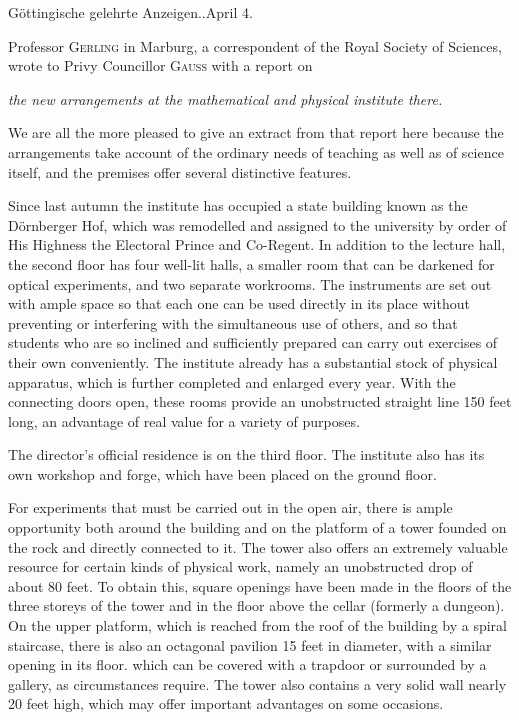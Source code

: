 \vspace{6mm}
\begin{center}\small Göttingische gelehrte Anzeigen..\quad April 4.\end{center}

Professor \textsc{Gerling} in Marburg, a correspondent of the Royal Society of Sciences, wrote to Privy Councillor \textsc{Gauss} with a report on
\begin{center}\textit{the new arrangements at the mathematical and physical institute there.}\end{center}
We are all the more pleased to give an extract from that report here because the arrangements take account of the ordinary needs of teaching as well as of science itself, and the premises offer several distinctive features.

Since last autumn the institute has occupied a state building known as the Dörnberger Hof, which was remodelled and assigned to the university by order of His Highness the Electoral Prince and Co-Regent. In addition to the lecture hall, the second floor has four well-lit halls, a smaller room that can be darkened for optical experiments, and two separate workrooms. The instruments are set out with ample space so that each one can be used directly in its place without preventing or
interfering with the simultaneous use of others, and so that students who are so inclined and sufficiently prepared can carry out exercises of their own conveniently. The institute already has a substantial stock of physical apparatus, which is further completed and enlarged every year. With the connecting doors open, these rooms provide an unobstructed straight line 150 feet long, an advantage of real value for a variety of purposes.

The director’s official residence is on the third floor. The institute also has its own workshop and forge, which have been placed on the ground floor.

For experiments that must be carried out in the open air, there is ample opportunity both around the building and on the platform of a tower founded on the rock and directly connected to it. The tower also offers an extremely valuable resource for certain kinds of physical work, namely an unobstructed drop of about 80 feet. To obtain this, square openings have been made in the floors of the three storeys of the tower and in the floor above the cellar (formerly a dungeon). On the upper platform, which is reached from the roof of the building by a spiral staircase, there is also an octagonal pavilion 15 feet in diameter, with a similar opening in its floor. which can be covered with a trapdoor or surrounded by a gallery, as circumstances require. The tower also contains a very solid wall nearly 20 feet high, which may offer important advantages on some occasions.

